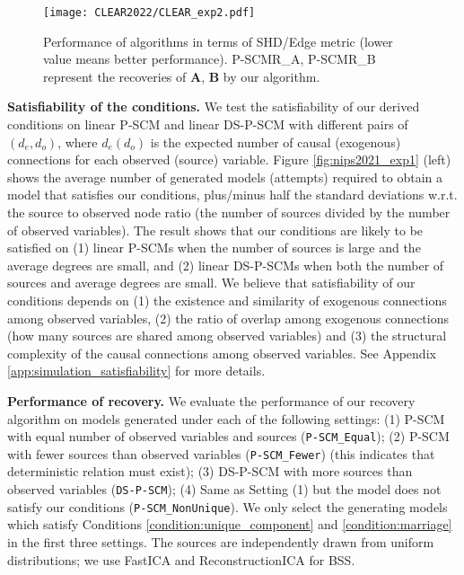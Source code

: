 \documentclass[12pt]{article}
\newcommand{\bA}{\mathbf{A}}
\newcommand{\bB}{\mathbf{B}}
\begin{document}
\begin{figure}%
\centering
\texttt{[image: CLEAR2022/CLEAR\_exp2.pdf]}
\caption{Performance of algorithms in terms of SHD/Edge metric (lower value means better performance). P-SCMR\_A, P-SCMR\_B represent the recoveries of $\bA$, $\bB$ by our algorithm.} %
\label{fig:nips2021_exp2} 
\end{figure}
{\bf Satisfiability of the conditions.}
We test the satisfiability of our derived conditions on linear P-SCM and linear DS-P-SCM with different pairs of $(d_e,d_o)$, where $d_e (d_o)$ is the expected number of causal (exogenous) connections for each observed (source) variable. 
Figure \ref{fig:nips2021_exp1} (left) shows the average number of generated models (attempts) required to obtain a model that satisfies our conditions, plus/minus half the standard deviations w.r.t. the source to observed node ratio (the number of sources divided by the number of observed variables). 
The result shows that our conditions are likely to be satisfied on (1) linear P-SCMs when the number of sources is large and the average degrees are small, and (2) linear DS-P-SCMs when both the number of sources and average degrees are small. We believe that satisfiability of our conditions depends on (1) the existence and similarity of exogenous connections among observed variables, (2) the ratio of overlap among exogenous connections (how many sources are shared among observed variables) and (3) the structural complexity of the causal connections among observed variables. See Appendix \ref{app:simulation_satisfiability} for more details. 

{\textbf{Performance of recovery.}}
We evaluate the performance of our recovery algorithm on models generated under each of the following settings: 
(1) P-SCM with equal number of observed variables and sources (\texttt{P-SCM\_Equal}); 
(2) P-SCM with fewer sources than observed variables (\texttt{P-SCM\_Fewer}) (this indicates that deterministic relation must exist); 
(3) DS-P-SCM with more sources than observed variables (\texttt{DS-P-SCM});
(4) Same as Setting (1) but the model does not satisfy our conditions (\texttt{P-SCM\_NonUnique}).
We only select the generating models which satisfy Conditions \ref{condition:unique_component} and \ref{condition:marriage} in the first three settings. The sources are independently drawn from uniform distributions; we use FastICA \citep{hyvarinen1999fast} and ReconstructionICA \citep{le2011ica} for BSS. 
\end{document}
